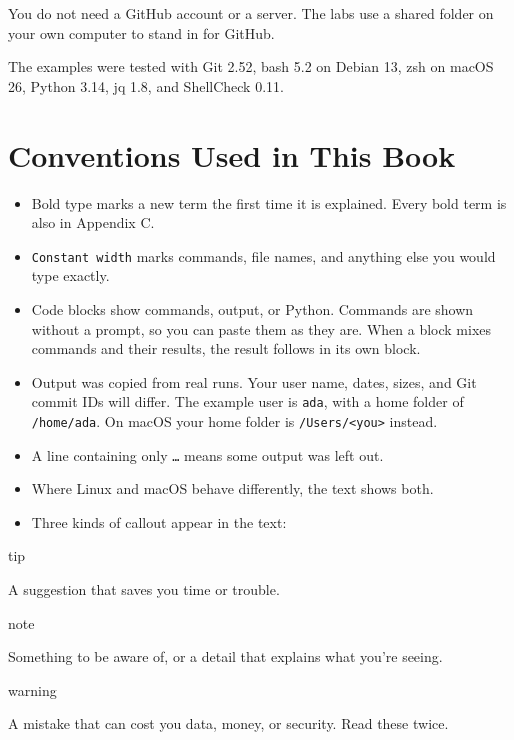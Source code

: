 You do not need a GitHub account or a server. The labs use a shared folder on your own computer to stand in for GitHub.

The examples were tested with Git 2.52, bash 5.2 on Debian 13, zsh on macOS 26, Python 3.14, jq 1.8, and ShellCheck 0.11.

\section{Conventions Used in This Book}\label{00-preface:conventions-used-in-this-book}

\begin{itemize}
\tightlist
\item
  Bold type marks a new term the first time it is explained. Every bold term is also in Appendix C.
\item
  \texttt{Constant\ width} marks commands, file names, and anything else you would type exactly.
\item
  Code blocks show commands, output, or Python. Commands are shown without a prompt, so you can paste them as they are. When a block mixes commands and their results, the result follows in its own block.
\item
  Output was copied from real runs. Your user name, dates, sizes, and Git commit IDs will differ. The example user is \texttt{ada}, with a home folder of \texttt{/home/ada}. On macOS your home folder is \texttt{/Users/\textless{}you\textgreater{}} instead.
\item
  A line containing only \texttt{…} means some output was left out.
\item
  Where Linux and macOS behave differently, the text shows both.
\item
  Three kinds of callout appear in the text:
\end{itemize}

\begin{callout}{tip}

A suggestion that saves you time or trouble.

\end{callout}

\begin{callout}{note}

Something to be aware of, or a detail that explains what you're seeing.

\end{callout}

\begin{callout}{warning}

A mistake that can cost you data, money, or security. Read these twice.

\end{callout}
